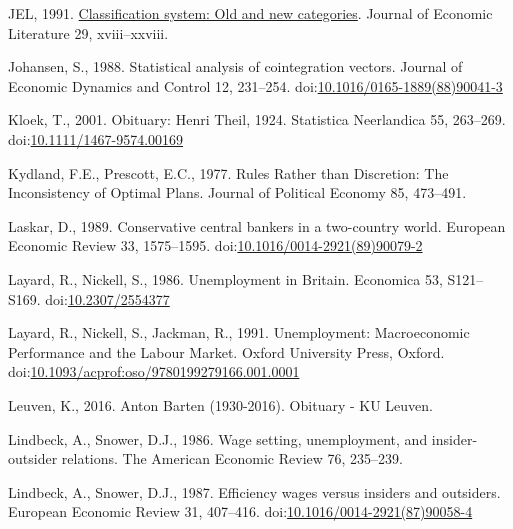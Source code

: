 \documentclass[
  12pt,
  onecolumn]{article}
\newlength{\cslhangindent}
\newlength{\cslentryspacingunit} %
\newenvironment{CSLReferences}[2] %
 {%
  \setlength{\parindent}{0pt}
  \ifodd #1
  \let\oldpar\par
  \def\par{\hangindent=\cslhangindent\oldpar}
  \fi
  \setlength{\parskip}{#2\cslentryspacingunit}
 }%
 {}
\begin{document}
\begin{CSLReferences}{1}{0}
\leavevmode{}%
JEL, 1991. \href{https://www.jstor.org/stable/2727351}{Classification
system: Old and new categories}. Journal of Economic Literature 29,
xviii--xxviii.

\leavevmode{}%
Johansen, S., 1988. Statistical analysis of cointegration vectors.
Journal of Economic Dynamics and Control 12, 231--254.
doi:\href{https://doi.org/10.1016/0165-1889(88)90041-3}{10.1016/0165-1889(88)90041-3}

\leavevmode{}%
Kloek, T., 2001. Obituary: {Henri Theil}, 1924.
Statistica Neerlandica 55, 263--269.
doi:\href{https://doi.org/10.1111/1467-9574.00169}{10.1111/1467-9574.00169}

\leavevmode{}%
Kydland, F.E., Prescott, E.C., 1977. Rules {Rather} than {Discretion}:
{The Inconsistency} of {Optimal Plans}. Journal of Political Economy 85,
473--491.

\leavevmode{}%
Laskar, D., 1989. Conservative central bankers in a two-country world.
European Economic Review 33, 1575--1595.
doi:\href{https://doi.org/10.1016/0014-2921(89)90079-2}{10.1016/0014-2921(89)90079-2}

\leavevmode{}%
Layard, R., Nickell, S., 1986. Unemployment in {Britain}. Economica 53,
S121--S169. doi:\href{https://doi.org/10.2307/2554377}{10.2307/2554377}

\leavevmode{}%
Layard, R., Nickell, S., Jackman, R., 1991. Unemployment: {Macroeconomic
Performance} and the {Labour Market}. {Oxford University Press},
{Oxford}.
doi:\href{https://doi.org/10.1093/acprof:oso/9780199279166.001.0001}{10.1093/acprof:oso/9780199279166.001.0001}

\leavevmode{}%
Leuven, K., 2016. Anton {Barten} (1930-2016). Obituary - KU Leuven.

\leavevmode{}%
Lindbeck, A., Snower, D.J., 1986. Wage setting, unemployment, and
insider-outsider relations. The American Economic Review 76, 235--239.

\leavevmode{}%
Lindbeck, A., Snower, D.J., 1987. Efficiency wages versus insiders and
outsiders. European Economic Review 31, 407--416.
doi:\href{https://doi.org/10.1016/0014-2921(87)90058-4}{10.1016/0014-2921(87)90058-4}


\end{CSLReferences}
\end{document}
